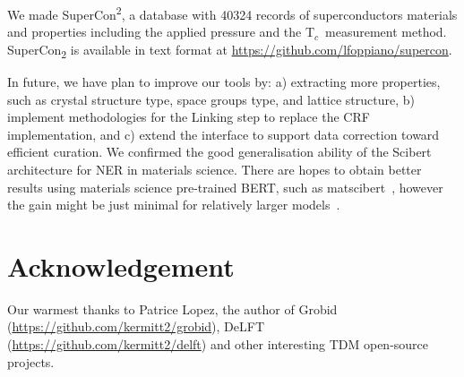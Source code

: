 \documentclass{article}
\newcommand{\tc}{T$_{c}$}
\begin{document}
We made SuperCon\textsuperscript{2}, a database with 40324 records of superconductors materials and properties including the applied pressure and the \tc~measurement method. 
SuperCon\textsubscript{2} is available in text format at \url{https://github.com/lfoppiano/supercon}.

In future, we have plan to improve our tools by: a) extracting more properties, such as crystal structure type, space groups type, and lattice structure, b) implement methodologies for the Linking step to replace the CRF implementation, and c) extend the interface to support data correction toward efficient curation.
We confirmed the good generalisation ability of the Scibert architecture for NER in materials science. 
There are hopes to obtain better results using materials science pre-trained BERT, such as matscibert~\cite{gupta_matscibert_2022}, however the gain might be just minimal for relatively larger models~\cite{hong2022ScholarBERT}.

\section{Acknowledgement}
\label{sec:acknowledgement}
Our warmest thanks to Patrice Lopez, the author of Grobid (\url{https://github.com/kermitt2/grobid}), DeLFT (\url{https://github.com/kermitt2/delft}) and other interesting TDM open-source projects.



\end{document}
